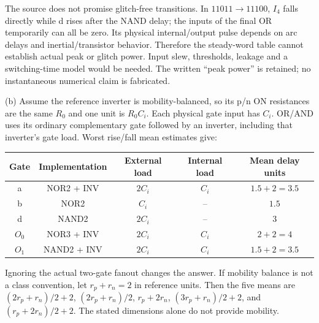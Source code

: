 \documentclass[10pt]{article}
\begin{document}
The source does not promise glitch-free transitions. In $11011\to11100$, $I_4$ falls directly while d rises after the NAND delay; the inputs of the final OR temporarily can all be zero. Its physical internal/output pulse depends on arc delays and inertial/transistor behavior. Therefore the steady-word table cannot establish actual peak or glitch power. Input slew, thresholds, leakage and a switching-time model would be needed. The written ``peak power'' is retained; no instantaneous numerical claim is fabricated.

(b) Assume the reference inverter is mobility-balanced, so its p/n ON resistances are the same $R_0$ and one unit is $R_0C_i$. Each physical gate input has $C_i$. OR/AND uses its ordinary complementary gate followed by an inverter, including that inverter's gate load. Worst rise/fall mean estimates give:
\begin{center}\begin{tabular}{ccccc}\toprule Gate&Implementation&External load&Internal load&Mean delay units\\\midrule
a&NOR2 + INV&$2C_i$&$C_i$&$1.5+2=3.5$\\
b&NOR2&$C_i$&--&$1.5$\\
d&NAND2&$2C_i$&--&$3$\\
$O_0$&NOR3 + INV&$2C_i$&$C_i$&$2+2=4$\\
$O_1$&NAND2 + INV&$2C_i$&$C_i$&$1.5+2=3.5$\\\bottomrule\end{tabular}\end{center}
Ignoring the actual two-gate fanout changes the answer. If mobility balance is not a class convention, let $r_p+r_n=2$ in reference units. Then the five means are $(2r_p+r_n)/2+2$, $(2r_p+r_n)/2$, $r_p+2r_n$, $(3r_p+r_n)/2+2$, and $(r_p+2r_n)/2+2$. The stated dimensions alone do not provide mobility.
\end{document}
